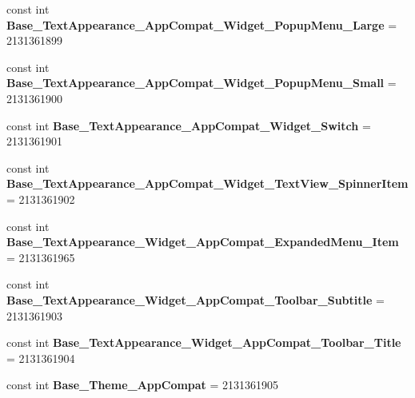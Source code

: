 \begin{DoxyCompactItemize}
const int {\bfseries Base\+\_\+\+Text\+Appearance\+\_\+\+App\+Compat\+\_\+\+Widget\+\_\+\+Popup\+Menu\+\_\+\+Large} = 2131361899
\item 
\mbox{\label{classXaria_1_1Resource_1_1Style_a1491bb5b44d2c8dab4dcef444152108c}} 
const int {\bfseries Base\+\_\+\+Text\+Appearance\+\_\+\+App\+Compat\+\_\+\+Widget\+\_\+\+Popup\+Menu\+\_\+\+Small} = 2131361900
\item 
\mbox{\label{classXaria_1_1Resource_1_1Style_a2a55c4af631de646dcb0c8e7509fd734}} 
const int {\bfseries Base\+\_\+\+Text\+Appearance\+\_\+\+App\+Compat\+\_\+\+Widget\+\_\+\+Switch} = 2131361901
\item 
\mbox{\label{classXaria_1_1Resource_1_1Style_a751bc8c725d000eebf66caafc4be6be3}} 
const int {\bfseries Base\+\_\+\+Text\+Appearance\+\_\+\+App\+Compat\+\_\+\+Widget\+\_\+\+Text\+View\+\_\+\+Spinner\+Item} = 2131361902
\item 
\mbox{\label{classXaria_1_1Resource_1_1Style_a0f562bfc387cd627718246c5c0ed5514}} 
const int {\bfseries Base\+\_\+\+Text\+Appearance\+\_\+\+Widget\+\_\+\+App\+Compat\+\_\+\+Expanded\+Menu\+\_\+\+Item} = 2131361965
\item 
\mbox{\label{classXaria_1_1Resource_1_1Style_a2c192c975b0dd623eaeab6ee54bc2f8d}} 
const int {\bfseries Base\+\_\+\+Text\+Appearance\+\_\+\+Widget\+\_\+\+App\+Compat\+\_\+\+Toolbar\+\_\+\+Subtitle} = 2131361903
\item 
\mbox{\label{classXaria_1_1Resource_1_1Style_a8125ab46f54f42638a69cb35ac34aab3}} 
const int {\bfseries Base\+\_\+\+Text\+Appearance\+\_\+\+Widget\+\_\+\+App\+Compat\+\_\+\+Toolbar\+\_\+\+Title} = 2131361904
\item 
\mbox{\label{classXaria_1_1Resource_1_1Style_ad921e4e912b1eb7fda1c2ab758957f24}} 
const int {\bfseries Base\+\_\+\+Theme\+\_\+\+App\+Compat} = 2131361905
\item 
\mbox{\label{classXaria_1_1Resource_1_1Style_a37046435a8078b1562b9771937930930}} 

\end{DoxyCompactItemize}
